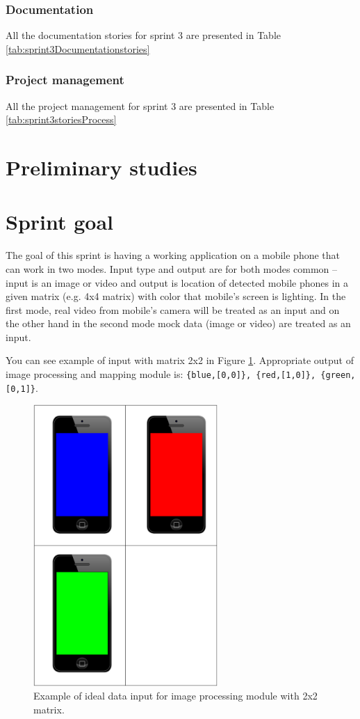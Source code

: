 \subsubsection*{Documentation}
All the documentation stories for sprint 3 are presented in Table \ref{tab:sprint3Documentationstories}

\subsubsection*{Project management}
All the project management for sprint 3 are presented in Table \ref{tab:sprint3storiesProcess}
\section{Preliminary studies}

\section{Sprint goal}
The goal of this sprint is having a working application on a mobile phone that can work in two modes.  
Input type and output are for both modes common -- input is an image or video and output is location of detected mobile phones in a given matrix (e.g. 4x4 matrix) with color that mobile's screen is lighting.
In the first mode, real video from mobile's camera will be treated as an input and on the other hand in the second mode mock data (image or video) are treated as an input.

You can see example of input with matrix 2x2 in Figure \ref{img:sprint3_goal}. Appropriate output of image processing and mapping module is: \texttt{\{blue,[0,0]\}, \{red,[1,0]\}, \{green,[0,1]\}}.

\begin{figure}[H]
	\centering
		\includegraphics[width=7cm]{sprint3/sprint3_goal.pdf}
	\caption{Example of ideal data input for image processing module with 2x2 matrix.}
	\label{img:sprint3_goal}
\end{figure}

